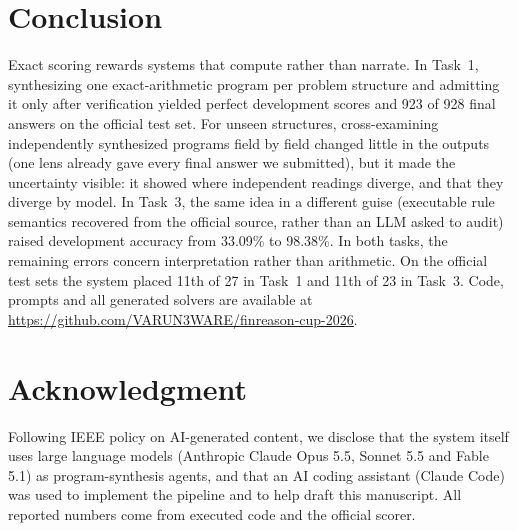 \documentclass[conference]{IEEEtran}
\newcommand{\repourl}{\url{https://github.com/VARUN3WARE/finreason-cup-2026}}
\begin{document}
\section{Conclusion}
Exact scoring rewards systems that compute rather than narrate. In Task~1, synthesizing one exact-arithmetic program
per problem structure and admitting it only after verification yielded perfect development scores and 923 of 928
final answers on the official test set. For unseen structures, cross-examining independently synthesized programs
field by field changed little in the outputs (one lens already gave every final answer we submitted), but it made the
uncertainty visible: it showed where independent readings diverge, and that they diverge by model. In Task~3, the
same idea in a different guise (executable rule semantics recovered from the official
source, rather than an LLM asked to audit) raised development accuracy from 33.09\% to 98.38\%. In both tasks, the
remaining errors concern interpretation rather than arithmetic. On the official test sets the system placed 11th of
27 in Task~1 and 11th of 23 in Task~3. Code, prompts and all generated solvers are available at \repourl.

\section*{Acknowledgment}
Following IEEE policy on AI-generated content, we disclose that the system itself uses large language models (Anthropic
Claude Opus 5.5, Sonnet 5.5 and Fable 5.1) as program-synthesis agents, and that an AI coding assistant (Claude Code)
was used to implement the pipeline and to help draft this manuscript. All reported numbers come from executed code and
the official scorer.



\end{document}
